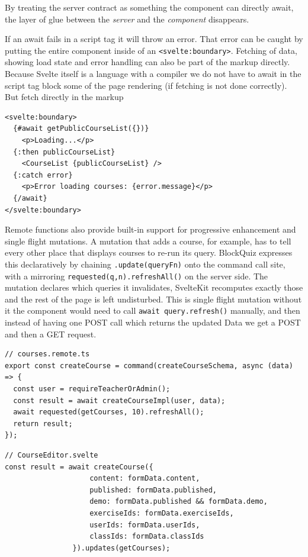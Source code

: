 By treating the server contract as something the component can directly await, the layer of glue between
the \textit{server} and the \textit{component} disappears.

If an await fails in a script tag it will throw an error.
That error can be caught by putting the entire component inside of an \texttt{<svelte:boundary>}.
Fetching of data, showing load state and error handling can also be part of the markup directly.
Because Svelte itself is a language with a compiler we do not have to await in the script tag block some of the page rendering (if fetching is not done correctly).
But fetch directly in the markup

\begin{lstlisting}[style=svelte, caption={Svelte Async Boundary}]
<svelte:boundary>
  {#await getPublicCourseList({})}
    <p>Loading...</p>
  {:then publicCourseList}
    <CourseList {publicCourseList} />
  {:catch error}
    <p>Error loading courses: {error.message}</p>
  {/await}
</svelte:boundary>
\end{lstlisting}

Remote functions also provide built-in support for progressive enhancement and single flight mutations.
A mutation that adds a course, for example, has to tell every other place that displays courses to re-run its query.
BlockQuiz expresses this declaratively by chaining \lstinline{.update(queryFn)} onto the command call site, with a mirroring
\lstinline{requested(q,n).refreshAll()} on the server side. The mutation declares which queries it invalidates, SvelteKit recomputes exactly those and
the rest of the page is left undisturbed. This is single flight mutation without it the component would need to call \lstinline{await query.refresh()} manually,
and then instead of having one POST call which returns the updated Data we get a POST and then a GET request.
\begin{lstlisting}[style=svelte, caption={Single Flight Mutation Example - 1}] 
// courses.remote.ts
export const createCourse = command(createCourseSchema, async (data) => {
  const user = requireTeacherOrAdmin();
  const result = await createCourseImpl(user, data);
  await requested(getCourses, 10).refreshAll();
  return result;
});
\end{lstlisting}
\begin{lstlisting}[style=svelte, caption={Single Flight Mutation Example - 2}] 
// CourseEditor.svelte
const result = await createCourse({
					content: formData.content,
					published: formData.published,
					demo: formData.published && formData.demo,
					exerciseIds: formData.exerciseIds,
					userIds: formData.userIds,
					classIds: formData.classIds
				}).updates(getCourses);
\end{lstlisting}


